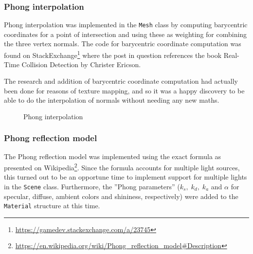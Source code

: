 \documentclass[a4paper,11pt]{article}
\begin{document}
\subsubsection{Phong interpolation}
Phong interpolation was implemented in the \texttt{Mesh} class by computing barycentric coordinates for 
a point of intersection and using these as weighting for combining the three vertex normals.
The code for barycentric coordinate computation was found on
StackExchange\footnote{\url{https://gamedev.stackexchange.com/a/23745}} where the post in question
references the book Real-Time Collision Detection by Christer Ericson.

The research and addition of barycentric coordinate computation had actually been done for
reasons of texture mapping, and so it was a happy discovery to be able to do the interpolation
of normals without needing any new maths.

\begin{figure}[H]
    \centering
    \qquad
    \caption{Phong interpolation}
\end{figure}

\subsubsection{Phong reflection model}
The Phong reflection model was implemented using the exact formula as presented on
Wikipedia\footnote{\url{https://en.wikipedia.org/wiki/Phong\_reflection\_model\#Description}}.
Since the formula accounts for multiple light sources, this turned out to be an opportune
time to implement support for multiple lights in the \texttt{Scene} class. Furthermore, the
''Phong parameters'' ($k_s,\; k_d,\; k_a$ and $\alpha$ for specular, diffuse, ambient colors
and shininess, respectively) were added to the \texttt{Material} structure at this time.
\end{document}
